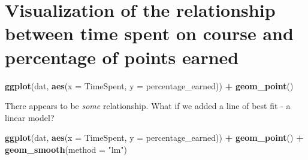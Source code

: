 \documentclass[]{book}
\newenvironment{Shaded}{\begin{snugshade}}{\end{snugshade}}
\newcommand{\KeywordTok}[1]{\textcolor[rgb]{0.13,0.29,0.53}{\textbf{#1}}}
\newcommand{\DataTypeTok}[1]{\textcolor[rgb]{0.13,0.29,0.53}{#1}}
\newcommand{\StringTok}[1]{\textcolor[rgb]{0.31,0.60,0.02}{#1}}
\newcommand{\CommentTok}[1]{\textcolor[rgb]{0.56,0.35,0.01}{\textit{#1}}}
\newcommand{\OtherTok}[1]{\textcolor[rgb]{0.56,0.35,0.01}{#1}}
\newcommand{\OperatorTok}[1]{\textcolor[rgb]{0.81,0.36,0.00}{\textbf{#1}}}
\newcommand{\NormalTok}[1]{#1}
\begin{document}
\begin{Shaded}
\end{Shaded}

\section{Visualization of the relationship between time spent on course
and percentage of points
earned}\label{visualization-of-the-relationship-between-time-spent-on-course-and-percentage-of-points-earned}

\begin{Shaded}
\begin{Highlighting}[]
\KeywordTok{ggplot}\NormalTok{(dat, }\KeywordTok{aes}\NormalTok{(}\DataTypeTok{x =}\NormalTok{ TimeSpent, }\DataTypeTok{y =}\NormalTok{ percentage_earned)) }\OperatorTok{+}
\StringTok{    }\KeywordTok{geom_point}\NormalTok{()}
\end{Highlighting}
\end{Shaded}

There appears to be \emph{some} relationship. What if we added a line of
best fit - a linear model?

\begin{Shaded}
\begin{Highlighting}[]
\KeywordTok{ggplot}\NormalTok{(dat, }\KeywordTok{aes}\NormalTok{(}\DataTypeTok{x =}\NormalTok{ TimeSpent, }\DataTypeTok{y =}\NormalTok{ percentage_earned)) }\OperatorTok{+}
\StringTok{    }\KeywordTok{geom_point}\NormalTok{() }\OperatorTok{+}\StringTok{ }
\StringTok{    }\KeywordTok{geom_smooth}\NormalTok{(}\DataTypeTok{method =} \StringTok{"lm"}\NormalTok{)}
\end{Highlighting}
\end{Shaded}
\end{document}
